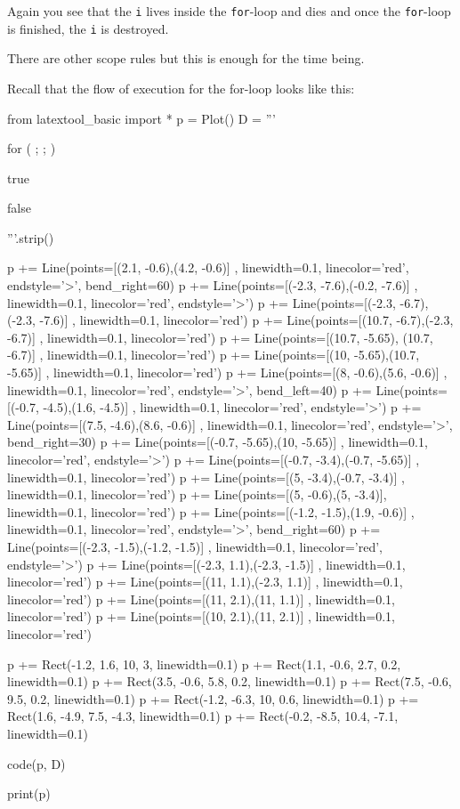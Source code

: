 Again you see that the \texttt{i} lives inside the \texttt{for}-loop and
dies and once the \texttt{for}-loop is finished, the \texttt{i} is
destroyed.

There are other scope rules but this is enough for the time being.

\newpage{}

Recall that the flow of execution for the for-loop looks like this:
\begin{python}
from latextool_basic import *
p = Plot()
D = '''





for (         ;                ;                )








true

         

false





'''.strip()

p += Line(points=[(2.1, -0.6),(4.2, -0.6)] , linewidth=0.1, linecolor='red', endstyle='>', bend_right=60)
p += Line(points=[(-2.3, -7.6),(-0.2, -7.6)] , linewidth=0.1, linecolor='red', endstyle='>')
p += Line(points=[(-2.3, -6.7),(-2.3, -7.6)] , linewidth=0.1, linecolor='red')
p += Line(points=[(10.7, -6.7),(-2.3, -6.7)] , linewidth=0.1, linecolor='red')
p += Line(points=[(10.7, -5.65), (10.7, -6.7)] , linewidth=0.1, linecolor='red')
p += Line(points=[(10, -5.65),(10.7, -5.65)] , linewidth=0.1, linecolor='red')
p += Line(points=[(8, -0.6),(5.6, -0.6)] , linewidth=0.1, linecolor='red', endstyle='>', bend_left=40)
p += Line(points=[(-0.7, -4.5),(1.6, -4.5)] , linewidth=0.1, linecolor='red', endstyle='>')
p += Line(points=[(7.5, -4.6),(8.6, -0.6)] , linewidth=0.1, linecolor='red', endstyle='>', bend_right=30)
p += Line(points=[(-0.7, -5.65),(10, -5.65)] , linewidth=0.1, linecolor='red', endstyle='>')
p += Line(points=[(-0.7, -3.4),(-0.7, -5.65)] , linewidth=0.1, linecolor='red')
p += Line(points=[(5, -3.4),(-0.7, -3.4)] , linewidth=0.1, linecolor='red')
p += Line(points=[(5, -0.6),(5, -3.4)], linewidth=0.1, linecolor='red')
p += Line(points=[(-1.2, -1.5),(1.9, -0.6)] , linewidth=0.1, linecolor='red', endstyle='>', bend_right=60)
p += Line(points=[(-2.3, -1.5),(-1.2, -1.5)] , linewidth=0.1, linecolor='red', endstyle='>')
p += Line(points=[(-2.3, 1.1),(-2.3, -1.5)] , linewidth=0.1, linecolor='red')
p += Line(points=[(11, 1.1),(-2.3, 1.1)] , linewidth=0.1, linecolor='red')
p += Line(points=[(11, 2.1),(11, 1.1)] , linewidth=0.1, linecolor='red')
p += Line(points=[(10, 2.1),(11, 2.1)] , linewidth=0.1, linecolor='red')

p += Rect(-1.2, 1.6, 10, 3, linewidth=0.1)
p += Rect(1.1, -0.6, 2.7, 0.2, linewidth=0.1)
p += Rect(3.5, -0.6, 5.8, 0.2, linewidth=0.1)
p += Rect(7.5, -0.6, 9.5, 0.2, linewidth=0.1)
p += Rect(-1.2, -6.3, 10, 0.6, linewidth=0.1)
p += Rect(1.6, -4.9, 7.5, -4.3, linewidth=0.1)
p += Rect(-0.2, -8.5, 10.4, -7.1, linewidth=0.1)

code(p, D)

print(p)
\end{python}

